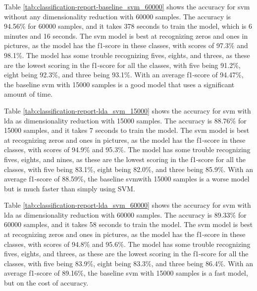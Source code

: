 
Table \ref{tab:classification-report-baseline_svm_60000} shows the accuracy for \gls{svm} without any dimensionality reduction with 60000 samples. The accuracy is 94.56\% for 60000 samples, and it takes 378 seconds to train the model, which is 6 minutes and 16 seconds. The \gls{svm} model is best at recognizing zeros and ones in pictures, as the model has the f1-score in these classes, with scores of 97.3\% and 98.1\%. The model has some trouble recognizing fives, eights, and threes, as these are the lowest scoring in the f1-score for all the classes, with five being 91.2\%, eight being 92.3\%, and three being 93.1\%. With an average f1-score of 94.47\%, the baseline \gls{svm} with 15000 samples is a good model that uses a significant amount of time.



Table \ref{tab:classification-report-lda_svm_15000} shows the accuracy for \gls{svm} with \gls{lda} as dimensionality reduction with 15000 samples. The accuracy is 88.76\% for 15000 samples, and it takes 7 seconds to train the model. The \gls{svm} model is best at recognizing zeros and ones in pictures, as the model has the f1-score in these classes, with scores of 94.9\% and 95.3\%. The model has some trouble recognizing fives, eights, and nines, as these are the lowest scoring in the f1-score for all the classes, with five being 83.1\%, eight being 82.0\%, and three being 85.9\%. With an average f1-score of 88.59\%, the baseline \gls{svm}with 15000 samples is a worse model but is much faster than simply using SVM.



Table \ref{tab:classification-report-lda_svm_60000} shows the accuracy for \gls{svm} with \gls{lda} as dimensionality reduction with 60000 samples. The accuracy is 89.33\% for 60000 samples, and it takes 58 seconds to train the model. The \gls{svm} model is best at recognizing zeros and ones in pictures, as the model has the f1-score in these classes, with scores of 94.8\% and 95.6\%. The model has some trouble recognizing fives, eights, and threes, as these are the lowest scoring in the f1-score for all the classes, with five being 83.9\%, eight being 83.3\%, and three being 86.4\%. With an average f1-score of 89.16\%, the baseline \gls{svm} with 15000 samples is a fast model, but on the cost of accuracy.

